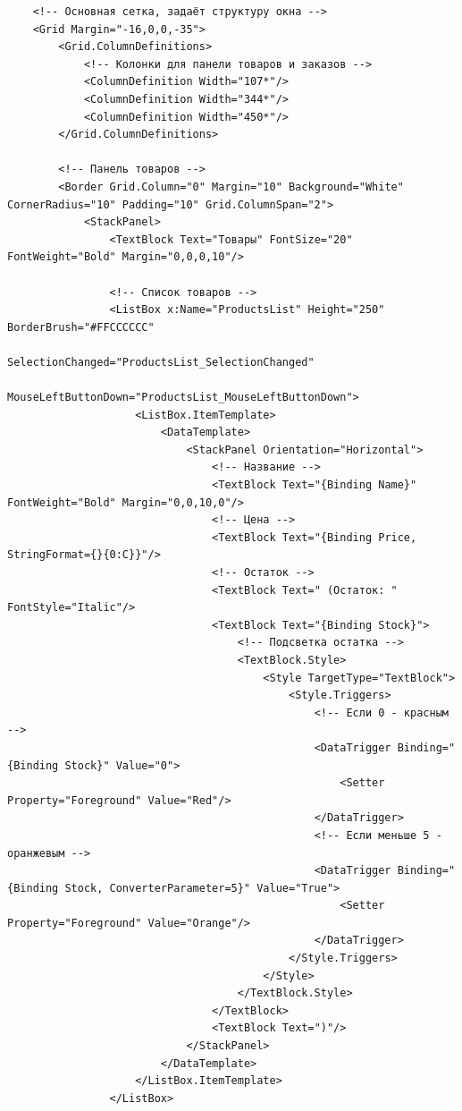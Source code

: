 \documentclass[12pt]{article}
\begin{document}
\begin{lstlisting}
    <!-- Основная сетка, задаёт структуру окна -->
    <Grid Margin="-16,0,0,-35">
        <Grid.ColumnDefinitions>
            <!-- Колонки для панели товаров и заказов -->
            <ColumnDefinition Width="107*"/>
            <ColumnDefinition Width="344*"/>
            <ColumnDefinition Width="450*"/>
        </Grid.ColumnDefinitions>

        <!-- Панель товаров -->
        <Border Grid.Column="0" Margin="10" Background="White" CornerRadius="10" Padding="10" Grid.ColumnSpan="2">
            <StackPanel>
                <TextBlock Text="Товары" FontSize="20" FontWeight="Bold" Margin="0,0,0,10"/>

                <!-- Список товаров -->
                <ListBox x:Name="ProductsList" Height="250" BorderBrush="#FFCCCCCC" 
                         SelectionChanged="ProductsList_SelectionChanged" 
                         MouseLeftButtonDown="ProductsList_MouseLeftButtonDown">
                    <ListBox.ItemTemplate>
                        <DataTemplate>
                            <StackPanel Orientation="Horizontal">
                                <!-- Название -->
                                <TextBlock Text="{Binding Name}" FontWeight="Bold" Margin="0,0,10,0"/>
                                <!-- Цена -->
                                <TextBlock Text="{Binding Price, StringFormat={}{0:C}}"/>
                                <!-- Остаток -->
                                <TextBlock Text=" (Остаток: " FontStyle="Italic"/>
                                <TextBlock Text="{Binding Stock}">
                                    <!-- Подсветка остатка -->
                                    <TextBlock.Style>
                                        <Style TargetType="TextBlock">
                                            <Style.Triggers>
                                                <!-- Если 0 - красным -->
                                                <DataTrigger Binding="{Binding Stock}" Value="0">
                                                    <Setter Property="Foreground" Value="Red"/>
                                                </DataTrigger>
                                                <!-- Если меньше 5 - оранжевым -->
                                                <DataTrigger Binding="{Binding Stock, ConverterParameter=5}" Value="True">
                                                    <Setter Property="Foreground" Value="Orange"/>
                                                </DataTrigger>
                                            </Style.Triggers>
                                        </Style>
                                    </TextBlock.Style>
                                </TextBlock>
                                <TextBlock Text=")"/>
                            </StackPanel>
                        </DataTemplate>
                    </ListBox.ItemTemplate>
                </ListBox>


\end{lstlisting}
\end{document}
